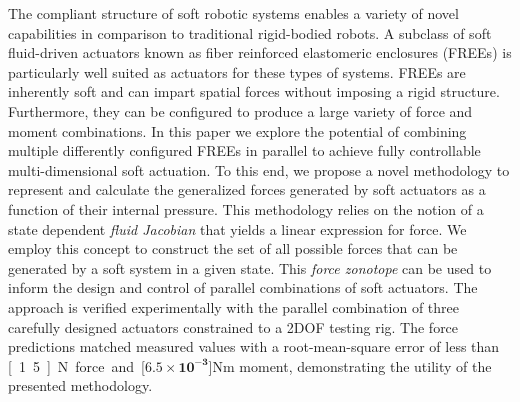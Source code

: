 The compliant structure of soft robotic systems enables a variety of novel capabilities in comparison to traditional rigid-bodied robots.
A subclass of soft fluid-driven actuators known as fiber reinforced elastomeric enclosures (FREEs) is particularly well suited as actuators for these types of systems.
FREEs are inherently soft and can impart spatial forces without imposing a rigid structure.
Furthermore, they can be configured to produce a large variety of force and moment combinations.
In this paper we explore the potential of combining multiple differently configured FREEs in parallel to achieve fully controllable multi-dimensional soft actuation.
To this end, we propose a novel methodology to represent and calculate the generalized forces generated by soft actuators as a function of their internal pressure.
This methodology relies on the notion of a state dependent \emph{fluid Jacobian} that yields a linear expression for force. We employ this concept to construct the set of all possible forces that can be generated by a soft system in a given state.
This \emph{force zonotope} can be used to inform the design and control of parallel combinations of soft actuators.  
The approach is verified experimentally with the parallel combination of three carefully designed actuators constrained to a 2DOF testing rig.
The force predictions matched measured values with a root-mean-square error of less than \unit[1.5]{N} force and \unit[$\mathbf{6.5 \times 10^{-3}}$]{Nm} moment, demonstrating the utility of the presented methodology.  








